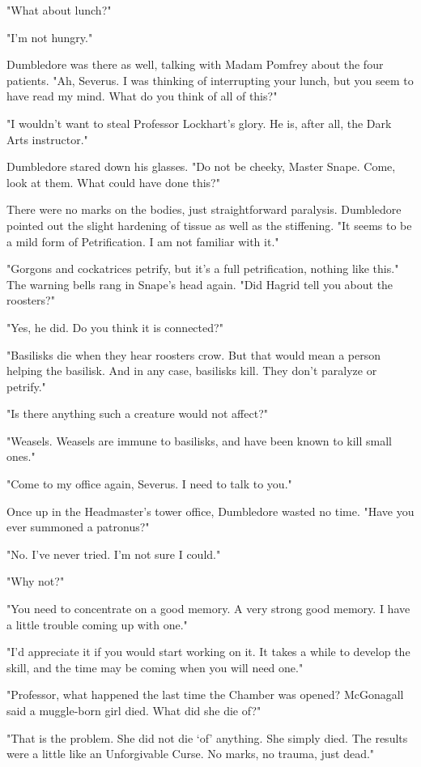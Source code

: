 "What about lunch?"

"I'm not hungry."

Dumbledore was there as well, talking with Madam Pomfrey about the four patients. "Ah, Severus. I was thinking of interrupting your lunch, but you seem to have read my mind. What do you think of all of this?"

"I wouldn't want to steal Professor Lockhart's glory. He is, after all, the Dark Arts instructor."

Dumbledore stared down his glasses. "Do not be cheeky, Master Snape. Come, look at them. What could have done this?"

There were no marks on the bodies, just straightforward paralysis. Dumbledore pointed out the slight hardening of tissue as well as the stiffening. "It seems to be a mild form of Petrification. I am not familiar with it."

"Gorgons and cockatrices petrify, but it's a full petrification, nothing like this." The warning bells rang in Snape's head again. "Did Hagrid tell you about the roosters?"

"Yes, he did. Do you think it is connected?"

"Basilisks die when they hear roosters crow. But that would mean a person helping the basilisk. And in any case, basilisks kill. They don't paralyze or petrify."

"Is there anything such a creature would not affect?"

"Weasels. Weasels are immune to basilisks, and have been known to kill small ones."

"Come to my office again, Severus. I need to talk to you."

Once up in the Headmaster's tower office, Dumbledore wasted no time. "Have you ever summoned a patronus?"

"No. I've never tried. I'm not sure I could."

"Why not?"

"You need to concentrate on a good memory. A very strong good memory. I have a little trouble coming up with one."

"I'd appreciate it if you would start working on it. It takes a while to develop the skill, and the time may be coming when you will need one."

"Professor, what happened the last time the Chamber was opened? McGonagall said a muggle-born girl died. What did she die of?"

"That is the problem. She did not die `of' anything. She simply died. The results were a little like an Unforgivable Curse. No marks, no trauma, just dead."

